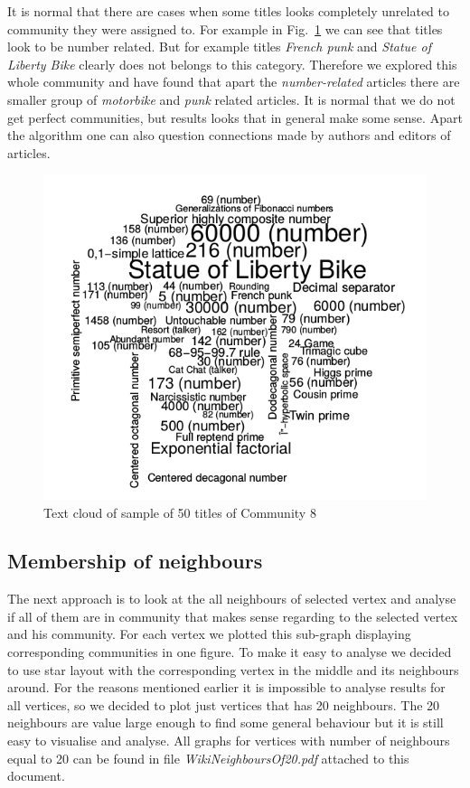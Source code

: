 \documentclass[paper=a4, fontsize=11pt]{scrartcl} %
\begin{document}
It is normal that there are cases when some titles looks completely unrelated to community they were assigned to. For example in Fig.~\ref{TextCloud8} we can see that titles look to be number related. But for example titles \textit{French punk} and \textit{Statue of Liberty Bike} clearly does not belongs to this category. Therefore we explored this whole community and have found that apart the \textit{number-related} articles there are smaller group of \textit{motorbike} and \textit{punk} related articles. It is normal that we do not get perfect communities, but results looks that in general make some sense. Apart the algorithm one can also question connections made by authors and editors of articles.
\begin{figure}[H]
	\centering
	\includegraphics[scale=0.75,keepaspectratio]{TextCloud8}
	\caption{Text cloud of sample of 50 titles of Community 8}
	\label{TextCloud8}
\end{figure}

\subsection{Membership of neighbours}
The next approach is to look at the all neighbours of selected vertex and analyse if all of them are in community that makes sense regarding to the selected vertex and his community. For each vertex we plotted this sub-graph displaying corresponding communities in one figure. To make it easy to analyse we decided to use star layout with the corresponding vertex in the middle and its neighbours around. For the reasons mentioned earlier it is impossible to analyse results for all vertices, so we decided to plot just vertices that has 20 neighbours. The 20 neighbours are value large enough to find some general behaviour but it is still easy to visualise and analyse. All graphs for vertices with number of neighbours equal to 20 can be found in file \textit{WikiNeighboursOf20.pdf} attached to this document.
\end{document}
